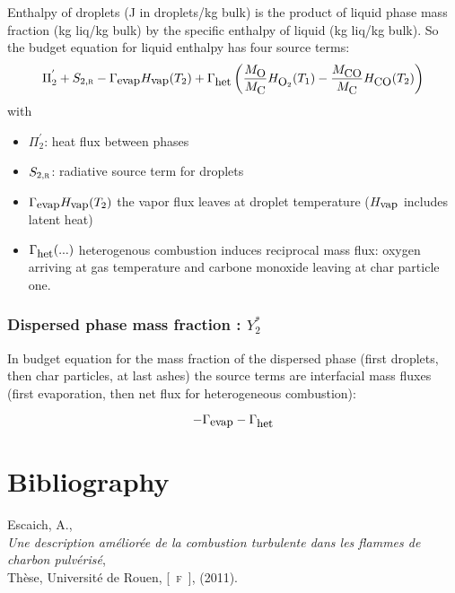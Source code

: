 Enthalpy of droplets (J in droplets/kg bulk) is the product of liquid phase mass
fraction (kg liq/kg bulk) by the specific enthalpy of liquid (kg liq/kg
bulk). So the budget equation for liquid enthalpy has four source terms:
\begin{equation}
     \Pi_{2}^{'}+S_{2,\mbox{\scriptsize\textsc{r}}}-\Gamma_{\mbox{\small evap}}H_{\mbox{\small vap}}(T_{2})
                        +\Gamma_{\mbox{\small het}}\left( \frac{M_{\mbox{\small O}}}{M_{\mbox{\small C}}}H_{\mbox{\small O}_{2}}(T_{1})
                                      -\frac{M_{\mbox{\small CO}   }}{M_{\mbox{\small C}}}H_{\mbox{\small CO}   }(T_{2})\right) 
\end{equation}
with
\begin{itemize}
\item $\Pi_{2}^{'}$: heat flux between phases
\item $S_{2,\mbox{\scriptsize\textsc{r}}}$: radiative source term for droplets
\item $\Gamma_{\mbox{\small evap}}H_{\mbox{\small vap}}(T_{2})$ the vapor flux leaves at droplet temperature ($H_{\mbox{\small vap}}$ includes latent heat)
\item $\Gamma_{\mbox{\small het}}(...)$ heterogenous combustion induces reciprocal mass flux: oxygen arriving at gas temperature and carbone monoxide leaving 
at char particle one.
\end{itemize}

\subsubsection{Dispersed phase mass fraction : $Y_{2}^{*}$}

In budget equation for the mass fraction of the dispersed phase (first droplets,
then char particles, at last ashes) the source terms are interfacial mass fluxes
(first evaporation, then net flux for heterogeneous combustion):

\begin{equation}
     -\Gamma_{\mbox{\small evap}}-\Gamma_{\mbox{\small het}}
\end{equation}

\section{Bibliography}
\begin{thebibliography}{1}

{\sc Escaich, A.},\\
{\em Une description am\'elior\'ee de la combustion turbulente dans les flammes de charbon pulv\'eris\'e},\\
Th\`ese, Universit\'e de Rouen, [\mbox{\textsc{ f }}], (2011).

\end{thebibliography}
\newpage


